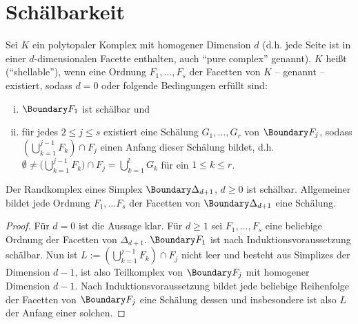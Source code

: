\chapter{Schälbarkeit}



\begin{df}
    Sei $K$ ein polytopaler Komplex mit homogener Dimension $d$ (d.h. jede Seite ist in einer $d$-dimensionalen Facette enthalten, auch “pure complex” genannt).
    $K$ heißt  (“shellable”), wenn eine Ordnung $F_1, \dotsc, F_s$ der Facetten von $K$ – genannt  – existiert, sodass $d = 0$ oder folgende Bedingungen erfüllt sind:
    \begin{enumerate}[i)]
        \item
            $\Boundary F_1$ ist schälbar und
        \item
            für jedes $2 \le j \le s$ existiert eine Schälung $G_1, \dotsc, G_r$ von $\Boundary F_j$, sodass $(\bigcup_{k=1}^{j-1} F_k) \cap F_j$ einen Anfang dieser Schälung bildet, d.h.
            \begin{math}
                \emptyset \neq \Big( \bigcup_{k=1}^{j-1} F_k \Big) \cap F_j = \bigcup_{k=1}^{l} G_k
            \end{math}
            für ein $1 \le k \le r$.
    \end{enumerate}
\end{df}

\begin{lem}
    Der Randkomplex eines Simplex $\Boundary \Delta_{d+1}$, $d \ge 0$ ist schälbar.
    Allgemeiner bildet jede Ordnung $F_1, \dotsc F_s$ der Facetten von $\Boundary \Delta_{d+1}$ eine Schälung.
    \begin{proof}
        Für $d = 0$ ist die Aussage klar.
        Für $d \ge 1$ sei $F_1, \dotsc, F_s$ eine beliebige Ordnung der Facetten von $\Delta_{d+1}$.
        $\Boundary F_1$ ist nach Induktionsvoraussetzung schälbar.
        Nun ist $L := (\bigcup_{k=1}^{j-1} F_k) \cap F_j$ nicht leer und besteht aus Simplizes der Dimension $d - 1$, ist also Teilkomplex von $\Boundary F_j$ mit homogener Dimension $d - 1$.
        Nach Induktionsvoraussetzung bildet jede beliebige Reihenfolge der Facetten von $\Boundary F_j$ eine Schälung dessen und insbesondere ist also $L$ der Anfang einer solchen.
    \end{proof}
\end{lem}

